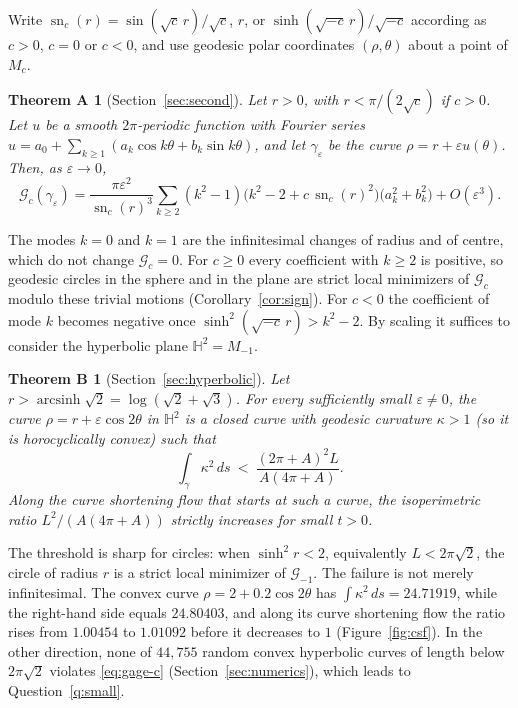 \documentclass[11pt]{amsart}
\newtheorem*{theoremA}{Theorem A}
\newtheorem*{theoremB}{Theorem B}
\theoremstyle{definition}
\theoremstyle{remark}
\numberwithin{equation}{section}
\DeclareMathOperator{\sn}{sn}
\DeclareMathOperator{\arcsinh}{arcsinh}
\newcommand{\HH}{\mathbb{H}}
\newcommand{\eps}{\varepsilon}
\newcommand{\G}{\mathcal{G}}
\begin{document}
Write $\sn_c(r)=\sin(\sqrt c\,r)/\sqrt c$, $r$, or $\sinh(\sqrt{-c}\,r)/\sqrt{-c}$ according as $c>0$, $c=0$ or $c<0$, and use geodesic polar coordinates $(\rho,\theta)$ about a point of $M_c$.

\begin{theoremA}[Section~\ref{sec:second}]
Let $r>0$, with $r<\pi/(2\sqrt c)$ if $c>0$. Let $u$ be a smooth $2\pi$-periodic function with Fourier series $u=a_0+\sum_{k\ge1}(a_k\cos k\theta+b_k\sin k\theta)$, and let $\gamma_\eps$ be the curve $\rho=r+\eps u(\theta)$. Then, as $\eps\to0$,
\begin{equation}\label{eq:main}
\G_c(\gamma_\eps)=\frac{\pi\eps^2}{\sn_c(r)^3}\sum_{k\ge2}(k^2-1)\bigl(k^2-2+c\,\sn_c(r)^2\bigr)\bigl(a_k^2+b_k^2\bigr)+O(\eps^3).
\end{equation}
\end{theoremA}

The modes $k=0$ and $k=1$ are the infinitesimal changes of radius and of centre, which do not change $\G_c=0$. For $c\ge0$ every coefficient with $k\ge2$ is positive, so geodesic circles in the sphere and in the plane are strict local minimizers of $\G_c$ modulo these trivial motions (Corollary~\ref{cor:sign}). For $c<0$ the coefficient of mode $k$ becomes negative once $\sinh^2(\sqrt{-c}\,r)>k^2-2$. By scaling it suffices to consider the hyperbolic plane $\HH^2=M_{-1}$.

\begin{theoremB}[Section~\ref{sec:hyperbolic}]
Let $r>\arcsinh\sqrt2=\log(\sqrt2+\sqrt3)$. For every sufficiently small $\eps\neq0$, the curve $\rho=r+\eps\cos 2\theta$ in $\HH^2$ is a closed curve with geodesic curvature $\kappa>1$ (so it is horocyclically convex) such that
\[
\int_\gamma\kappa^2\,ds\ <\ \frac{(2\pi+A)^2L}{A(4\pi+A)}.
\]
Along the curve shortening flow that starts at such a curve, the isoperimetric ratio $L^2/(A(4\pi+A))$ strictly increases for small $t>0$.
\end{theoremB}

The threshold is sharp for circles: when $\sinh^2 r<2$, equivalently $L<2\pi\sqrt2$, the circle of radius $r$ is a strict local minimizer of $\G_{-1}$. The failure is not merely infinitesimal. The convex curve $\rho=2+0.2\cos2\theta$ has $\int\kappa^2\,ds=24.71919$, while the right-hand side equals $24.80403$, and along its curve shortening flow the ratio rises from $1.00454$ to $1.01092$ before it decreases to $1$ (Figure~\ref{fig:csf}). In the other direction, none of $44{,}755$ random convex hyperbolic curves of length below $2\pi\sqrt2$ violates \eqref{eq:gage-c} (Section~\ref{sec:numerics}), which leads to Question~\ref{q:small}.
\end{document}
